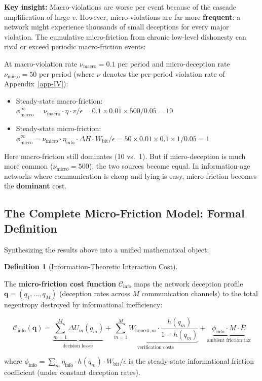 \documentclass[11pt]{article}
\theoremstyle{plain}
\theoremstyle{definition}
\newtheorem{definition}{Definition}
\theoremstyle{remark}
\let\origsubsection\subsection
\renewcommand{\subsection}{\needspace{7\baselineskip}\origsubsection}
\providecommand{\tightlist}{%
  \setlength{\itemsep}{0pt}\setlength{\parskip}{0pt}}
\begin{document}
\textbf{Key insight:} Macro-violations are worse per event because of
the cascade amplification of large \(v\). However, micro-violations are
far more \textbf{frequent}: a network might experience thousands of
small deceptions for every major violation. The cumulative
micro-friction from chronic low-level dishonesty can rival or exceed
periodic macro-friction events:

At macro-violation rate \(\nu_{\text{macro}} = 0.1\) per period and
micro-deception rate \(\nu_{\text{micro}} = 50\) per period (where
\(\nu\) denotes the per-period violation rate of Appendix~\ref{app-IV}):

\begin{itemize}
\tightlist
\item
  Steady-state macro-friction:
  \(\phi_{\text{macro}}^{\infty} = \nu_{\text{macro}} \cdot \eta \cdot v / \epsilon = 0.1 \times 0.01 \times 500 / 0.05 = 10\)
\item
  Steady-state micro-friction:
  \(\phi_{\text{micro}}^{\infty} = \nu_{\text{micro}} \cdot \eta_{\text{info}} \cdot \Delta H \cdot W_{\text{bit}} / \epsilon = 50 \times 0.01 \times 0.1 \times 1 / 0.05 = 1\)
\end{itemize}

Here macro-friction still dominates (10 vs.~1). But if micro-deception
is much more common (\(\nu_{\text{micro}} = 500\)), the two sources
become equal. In information-age networks where communication is cheap
and lying is easy, micro-friction becomes the \textbf{dominant} cost.

\subsection{The Complete Micro-Friction Model: Formal
Definition}\label{the-complete-micro-friction-model-formal-definition}

Synthesizing the results above into a unified mathematical object:

\begin{definition}[Information-Theoretic Interaction Cost]
\label{def-info-interaction-cost}

The \textbf{micro-friction cost function} $\mathcal{C}_{\text{info}}$ maps the network deception profile $\mathbf{q} = (q_1, \ldots, q_M)$ (deception rates across $M$ communication channels) to the total negentropy destroyed by informational inefficiency:

$$\mathcal{C}_{\text{info}}(\mathbf{q}) = \underbrace{\sum_{m=1}^{M} \Delta U_m(q_m)}_{\text{decision losses}} + \underbrace{\sum_{m=1}^{M} W_{\text{honest},m} \cdot \frac{h(q_m)}{1 - h(q_m)}}_{\text{verification costs}} + \underbrace{\phi_{\text{info}} \cdot M \cdot \bar{E}}_{\text{ambient friction tax}}$$

where $\phi_{\text{info}} = \sum_{m} \eta_{\text{info}} \cdot h(q_m) \cdot W_{\text{bit}} / \epsilon$ is the steady-state informational friction coefficient (under constant deception rates).
\end{definition}
\end{document}

